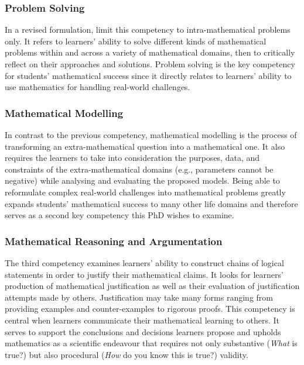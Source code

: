 \documentclass[
    a4paper,                %
    11pt,                   %
    stu,                    %
    donotrepeattitle,       %
    floatsintext,           %
    biblatex,               %
    colorlinks=true,        %
    linkcolor=red,          %
    anchorcolor=black,      %
    citecolor=blue,         %
    urlcolor=blue,          %
    bookmarks=true,         %
    bookmarksopen=false,    %
    bookmarksnumbered=true, %
    dvipsnames              %
]{apa7}
\begin{document}
\subsubsection{Problem Solving}

In a revised formulation, \textcite{niss:2019} limit this competency to intra-mathematical problems only. It refers to learners' ability to solve different kinds of mathematical problems within and across a variety of mathematical domains, then to critically reflect on their approaches and solutions. Problem solving is the key competency for students' mathematical success since it directly relates to learners' ability to use mathematics for handling real-world challenges.

\subsubsection{Mathematical Modelling}

In contrast to the previous competency, mathematical modelling is the process of transforming an extra-mathematical question into a mathematical one. It also requires the learners to take into consideration the purposes, data, and constraints of the extra-mathematical domains (e.g., parameters cannot be negative) while analysing and evaluating the proposed models. Being able to reformulate complex real-world challenges into mathematical problems greatly expands students' mathematical success to many other life domains and therefore serves as a second key competency this PhD wishes to examine.

\subsubsection{Mathematical Reasoning and Argumentation}

The third competency examines learners' ability to construct chains of logical statements in order to justify their mathematical claims. It looks for learners' production of mathematical justification as well as their evaluation of justification attempts made by others. Justification may take many forms ranging from providing examples and counter-examples to rigorous proofs. This competency is central when learners communicate their mathematical learning to others. It serves to support the conclusions and decisions learners propose and upholds mathematics as a scientific endeavour that requires not only substantive (\emph{What} is true?) but also procedural (\emph{How} do you know this is true?) validity.
\end{document}
